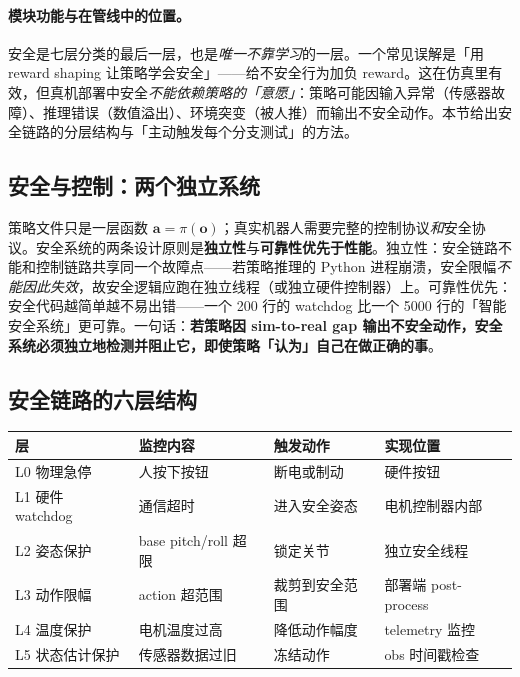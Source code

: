 \paragraph{模块功能与在管线中的位置。}安全是七层分类的最后一层，也是\emph{唯一不靠学习}的一层。一个常见误解是「用 reward shaping 让策略学会安全」——给不安全行为加负 reward。这在仿真里有效，但真机部署中安全\emph{不能依赖策略的「意愿」}：策略可能因输入异常（传感器故障）、推理错误（数值溢出）、环境突变（被人推）而输出不安全动作。本节给出安全链路的分层结构与「主动触发每个分支测试」的方法。

\subsection{安全与控制：两个独立系统}
\label{sec:rlmc-s2r-safety-two}

\begin{insight}[安全系统不能依赖策略的正确性]\label{ins:rlmc-s2r-safety}
策略文件只是一层函数 $\mathbf a=\pi(\mathbf o)$；真实机器人需要完整的控制协议\emph{和}安全协议。安全系统的两条设计原则是\textbf{独立性}与\textbf{可靠性优先于性能}。独立性：安全链路不能和控制链路共享同一个故障点——若策略推理的 Python 进程崩溃，安全限幅\emph{不能因此失效}，故安全逻辑应跑在独立线程（或独立硬件控制器）上。可靠性优先：安全代码越简单越不易出错——一个 200 行的 watchdog 比一个 5000 行的「智能安全系统」更可靠。一句话：\textbf{若策略因 sim-to-real gap 输出不安全动作，安全系统必须独立地检测并阻止它，即使策略「认为」自己在做正确的事}。
\end{insight}

\subsection{安全链路的六层结构}
\label{sec:rlmc-s2r-safety-layers}

\begin{center}
\small
\begin{tabular}{@{}llp{3.0cm}p{2.8cm}@{}}
\toprule
层 & 监控内容 & 触发动作 & 实现位置 \\
\midrule
L0 物理急停 & 人按下按钮 & 断电或制动 & 硬件按钮 \\
L1 硬件 watchdog & 通信超时 & 进入安全姿态 & 电机控制器内部 \\
L2 姿态保护 & base pitch/roll 超限 & 锁定关节 & 独立安全线程 \\
L3 动作限幅 & action 超范围 & 裁剪到安全范围 & 部署端 post-process \\
L4 温度保护 & 电机温度过高 & 降低动作幅度 & telemetry 监控 \\
L5 状态估计保护 & 传感器数据过旧 & 冻结动作 & obs 时间戳检查 \\
\bottomrule
\end{tabular}
\end{center}

